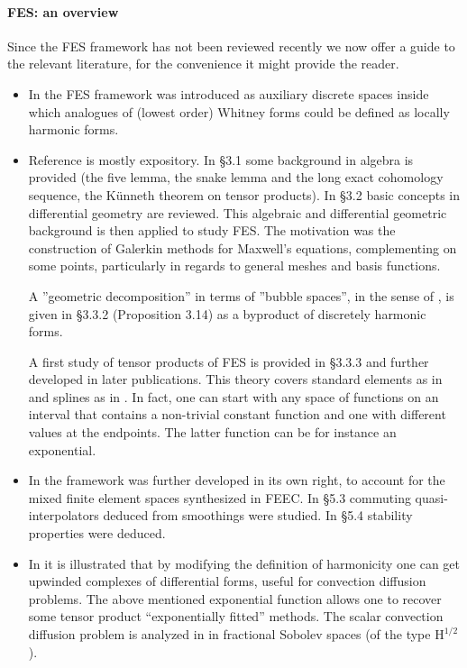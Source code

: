 \documentclass[10pt,a4paper]{article}
\newcommand{\rmH}{\mathrm{H}}
\theoremstyle{remark}
\theoremstyle{definition}
\numberwithin{equation}{section}
\begin{document}
\paragraph{FES: an overview}  Since the FES framework has not been reviewed recently we now offer a guide to the relevant literature, for the convenience it might provide the reader.
\begin{itemize}
\item In \cite{Chr08M3AS} the FES framework was introduced as auxiliary discrete spaces inside which analogues of (lowest order) Whitney forms could be defined as locally harmonic forms.
\item Reference \cite{Chr09AWM} is mostly expository.  In \S 3.1 some background in algebra is provided (the five lemma, the snake lemma and the long exact cohomology sequence, the Künneth theorem on tensor products). In \S 3.2 basic concepts in differential geometry are reviewed. This algebraic and differential geometric background is then applied to study FES. The motivation was the construction of Galerkin methods for Maxwell's equations, complementing \cite{Hip02,Jol03,Mon03} on some points, particularly in regards to general meshes and basis functions.

  A ''geometric decomposition'' in terms of ''bubble spaces'', in the sense of \cite{ArnFalWin09}, is given in \S 3.3.2 (Proposition 3.14) as a byproduct of discretely harmonic forms.

  A first study of tensor products of FES is provided in \S 3.3.3 and further developed in later publications. This theory covers standard elements as in \cite[\S 3]{ArnBofBon15} and splines as in \cite{BufRivSanVaz11}. In fact, one can start with any space of functions on an interval that contains a non-trivial constant function and one with different values at the endpoints. The latter function can be for instance an exponential. 

\item In \cite[\S 5]{ChrMunOwr11} the framework was further developed in its own right, to account for the mixed finite element spaces synthesized in FEEC. In \S 5.3 commuting quasi-interpolators deduced from smoothings were studied. In \S 5.4 stability properties were deduced.

\item In \cite{Chr13FoCM} it is illustrated that by modifying the definition of harmonicity one can get upwinded complexes of differential forms, useful for convection diffusion problems. The above mentioned exponential function allows one to recover some tensor product ``exponentially fitted'' methods. The scalar convection diffusion problem is analyzed in \cite{ChrHalSor14} in fractional Sobolev spaces (of the type $\rmH^{1/2}$).
  

\end{itemize}
\end{document}
